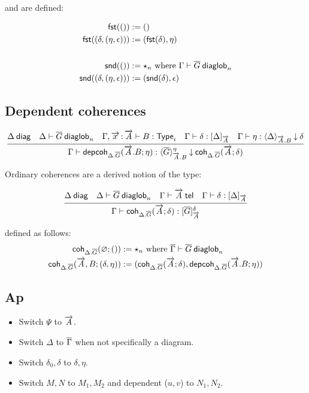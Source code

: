 and are defined:

\[\begin{aligned}
\mathsf{fst}(()) &:= () \\
\mathsf{fst}((\delta,(\eta,\epsilon))) &:=
(\mathsf{fst}(\delta),\eta) \\
&\\
\mathsf{snd}(()) &:= \mathbf{\star}_{n}
\text{ where ${\Gamma} \vdash {\ensuremath{\overline{G}}} \: \mathsf{diaglob}_{n}$} \\
\mathsf{snd}((\delta,(\eta,\epsilon))) &:=
(\mathsf{snd}(\delta),\epsilon) \\
\end{aligned}\]

\subsection{Dependent coherences}

\begin{small}
\[
\infer
  {\ofdepglob{\Gamma}{\depcoh{\Delta.\diag G}{\tel A.B}{\eta}}
    {\interpdepglob{\diag G}{\tel A.B}{\eta}}{\coh{\Delta.\diag
    G}{\tel A}{\delta}}}
  {\wfdiag{\Delta}
  &\wfdiaglob{\Delta}{\diag G}n
  &\wftype{\Gamma,\teltm xA}{B}
  &\ofinterp{\Gamma}{\delta}{\Delta}{\tel A}
  &\ofinterpdep{\Gamma}{\eta}{\Delta}{\tel A.B}{\delta}}
\]
\end{small}

Ordinary coherences are a derived notion of the type:
\begin{small}
  \[
  \infer{\ofglob{\Gamma}{\coh{{\Delta}.\diag{G}}{\tel A}{\delta}}
    {\interpglob{\diag{G}}{\tel A}{\delta}}}
  {\wfdiag{\Delta}
    & \wfdiaglob{\Delta}{\diag G}n
    & \wftel{\Gamma}{\tel A}
    & \ofinterp{\Gamma}{\delta}{\Delta}{\tel A}}
  \]
\end{small}

defined as follows:
\[\begin{aligned}
\mathsf{coh}_{{\Delta}.\overline{G}} ({\varnothing};{()}) &:=
\mathbf{\star}_{n}
\text{ where ${\overline{\Gamma}} \vdash {\ensuremath{\overline{G}}} \: \mathsf{diaglob}_{n}$} \\
\mathsf{coh}_{{\Delta}.\overline{G}} ({\overrightarrow{A},B};{(\delta,\eta)}) &:=
(\mathsf{coh}_{{\Delta}.\overline{G}} ({\overrightarrow{A}};{\delta}),
\mathsf{depcoh}_{{\Delta}.\overline{G}} ({\overrightarrow{A}.B};{\eta}))
\end{aligned}\]


\subsection{Ap}

\begin{itemize}
\item Switch $\Psi$ to $\overrightarrow{A}$.
\item Switch $\Delta$ to $\overline{\Gamma}$ when not specifically a diagram.
\item Switch $\delta_0,\delta$ to $\delta,\eta$.
\item Switch $M,N$ to $M_1,M_2$ and dependent ($u,v$) to $N_1,N_2$.
\end{itemize}

